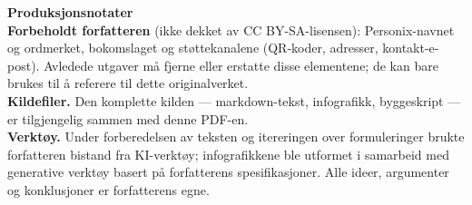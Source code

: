 \clearpage
\thispagestyle{empty}
\begin{flushleft}\small\sffamily
\textbf{Produksjonsnotater}\\[1.2em]

\textbf{Forbeholdt forfatteren} (ikke dekket av CC BY-SA-lisensen): Personix-navnet
og ordmerket, bokomslaget og støttekanalene (QR-koder, adresser, kontakt-e-post).
Avledede utgaver må fjerne eller erstatte disse elementene; de kan bare brukes
til å referere til dette originalverket.\\[1.2em]

\textbf{Kildefiler.} Den komplette kilden --- markdown-tekst, infografikk,
byggeskript --- er tilgjengelig sammen med denne PDF-en.\\[1.2em]

\textbf{Verktøy.} Under forberedelsen av teksten og itereringen over formuleringer
brukte forfatteren bistand fra KI-verktøy; infografikkene ble utformet
i samarbeid med generative verktøy basert på forfatterens spesifikasjoner.
Alle ideer, argumenter og konklusjoner er forfatterens egne.
\end{flushleft}
\clearpage

